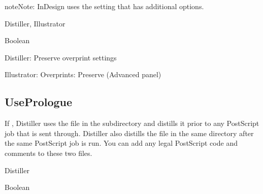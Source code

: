 \documentclass[letterpaper,12pt,english,openany,oneside]{sphinxmanual}
\begin{document}
\begin{sphinxadmonition}{note}{Note:}
InDesign uses the  setting that has additional options.
\end{sphinxadmonition}
\label{\detokenize{PDF_Create_CommonSettings:supported-by-106}}

Distiller, Illustrator

\label{\detokenize{PDF_Create_CommonSettings:type-105}}

Boolean

\label{\detokenize{PDF_Create_CommonSettings:ui-name-87}}

Distiller: Preserve overprint settings

Illustrator: Overprints: Preserve (Advanced panel)

\label{\detokenize{PDF_Create_CommonSettings:default-value-100}}

\begin{sphinxVerbatim}[commandchars=\\\{\}]
\end{sphinxVerbatim}


\subsection{UsePrologue}
\label{\detokenize{PDF_Create_CommonSettings:useprologue}}
If  , Distiller uses the  file in the  subdirectory and distills it prior to any PostScript job that is sent through. Distiller also distills the  file in the same directory after the same PostScript job is run. You can add any legal PostScript code and comments to these two files.

\label{\detokenize{PDF_Create_CommonSettings:supported-by-107}}

Distiller

\label{\detokenize{PDF_Create_CommonSettings:type-106}}

Boolean

\label{\detokenize{PDF_Create_CommonSettings:ui-name-88}}
\end{document}
